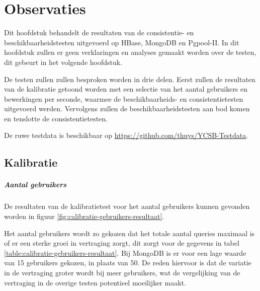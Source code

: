 \chapter{Observaties}\label{sec:observaties}
Dit hoofdstuk behandelt de resultaten van de consistentie- en beschikbaarheidstesten uitgevoerd op HBase, MongoDB en Pgpool-II. In dit hoofdstuk zullen er geen verklaringen en analyses gemaakt worden over de testen, dit gebeurt in het volgende hoofdstuk. 

De testen zullen zullen besproken worden in drie delen. Eerst zullen de resultaten van de kalibratie getoond worden met een selectie van het aantal gebruikers en bewerkingen per seconde, waarmee de beschikbaarheids- en consistentietesten uitgevoerd werden. Vervolgens zullen de beschikbaarheidstesten aan bod komen en tenslotte de consistentietesten. 

De ruwe testdata is beschikbaar op \url{https://github.com/thuys/YCSB-Testdata}. 

\section{Kalibratie}

\paragraph{Aantal gebruikers}
De resultaten van de kalibratietest voor het aantal gebruikers kunnen gevonden worden in figuur \ref{fig:calibratie-gebruikers-resultaat}. 

Het aantal gebruikers wordt zo gekozen dat het totale aantal queries maximaal is of er een sterke groei in vertraging zorgt, dit zorgt voor de gegevens in tabel \ref{table:calibratie-gebruikers-resultaat}. Bij MongoDB is er voor een lage waarde van 15 gebruikers gekozen, in plaats van 50. De reden hiervoor is dat de variatie in de vertraging groter wordt bij meer gebruikers, wat de vergelijking van de vertraging in de overige testen potentieel moeilijker maakt.  

